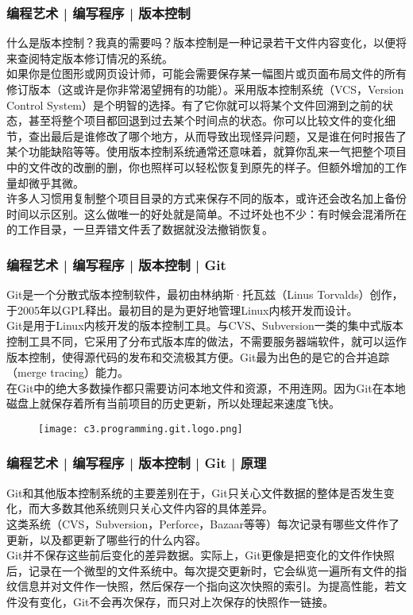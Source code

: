 \begin{frame}
  \frametitle{编程艺术 | 编写程序 | 版本控制}
  什么是版本控制？我真的需要吗？版本控制是一种记录若干文件内容变化，以便将来查阅特定版本修订情况的系统。\\
  \vspace{1em}
  如果你是位图形或网页设计师，可能会需要保存某一幅图片或页面布局文件的所有修订版本（这或许是你非常渴望拥有的功能）。采用版本控制系统（VCS，Version Control System）是个明智的选择。有了它你就可以将某个文件回溯到之前的状态，甚至将整个项目都回退到过去某个时间点的状态。你可以比较文件的变化细节，查出最后是谁修改了哪个地方，从而导致出现怪异问题，又是谁在何时报告了某个功能缺陷等等。使用版本控制系统通常还意味着，就算你乱来一气把整个项目中的文件改的改删的删，你也照样可以轻松恢复到原先的样子。但额外增加的工作量却微乎其微。\\
  \vspace{1em}
  许多人习惯用复制整个项目目录的方式来保存不同的版本，或许还会改名加上备份时间以示区别。这么做唯一的好处就是简单。不过坏处也不少：有时候会混淆所在的工作目录，一旦弄错文件丢了数据就没法撤销恢复。
\end{frame}

\begin{frame}
  \frametitle{编程艺术 | 编写程序 | 版本控制 | \alert{Git}}
  Git是一个\alert{分散式版本控制软件}，最初由\alert{林纳斯·托瓦兹（Linus Torvalds）}创作，于2005年以GPL释出。最初目的是为更好地管理Linux内核开发而设计。\\
  \vspace{0.5em}
Git是用于Linux内核开发的版本控制工具。与CVS、Subversion一类的集中式版本控制工具不同，它采用了\alert{分布式版本库}的做法，不需要服务器端软件，就可以运作版本控制，使得源代码的发布和交流极其方便。Git最为出色的是它的合并追踪（merge tracing）能力。\\
\vspace{0.5em}
在Git中的绝大多数操作都只需要访问本地文件和资源，不用连网。因为Git在本地磁盘上就保存着所有当前项目的历史更新，所以处理起来速度飞快。
\begin{figure}
  \centering
  \texttt{[image: c3.programming.git.logo.png]}
\end{figure}
\end{frame}

\begin{frame}
  \frametitle{编程艺术 | 编写程序 | 版本控制 | Git | 原理}
Git和其他版本控制系统的主要差别在于，Git只关心文件数据的整体是否发生变化，而大多数其他系统则只关心文件内容的具体差异。\\
  \vspace{1em}
  这类系统（CVS，Subversion，Perforce，Bazaar等等）每次记录有哪些文件作了更新，以及都更新了哪些行的什么内容。\\
  \vspace{1em}
  Git并不保存这些前后变化的差异数据。实际上，Git更像是把变化的文件作快照后，记录在一个微型的文件系统中。每次提交更新时，它会纵览一遍所有文件的指纹信息并对文件作一快照，然后保存一个指向这次快照的索引。为提高性能，若文件没有变化，Git不会再次保存，而只对上次保存的快照作一链接。
\end{frame}

